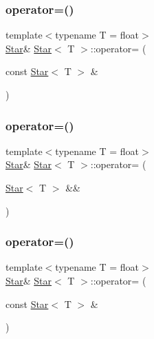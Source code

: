 \subsubsection{\texorpdfstring{operator=()}{operator=()}\hspace{0.1cm}{\footnotesize\ttfamily [2/4]}}
{\footnotesize\ttfamily template$<$typename T  = float$>$ \\
\mbox{\hyperlink{classStar}{Star}}\& \mbox{\hyperlink{classStar}{Star}}$<$ T $>$\+::operator= (\begin{DoxyParamCaption}\item[{const \mbox{\hyperlink{classStar}{Star}}$<$ T $>$ \&}]{ }\end{DoxyParamCaption})\hspace{0.3cm}{\ttfamily [default]}}

\mbox{\label{classStar_a7113d2808314f0aa2f5a87325f8c535d}} 
\subsubsection{\texorpdfstring{operator=()}{operator=()}\hspace{0.1cm}{\footnotesize\ttfamily [3/4]}}
{\footnotesize\ttfamily template$<$typename T  = float$>$ \\
\mbox{\hyperlink{classStar}{Star}}\& \mbox{\hyperlink{classStar}{Star}}$<$ T $>$\+::operator= (\begin{DoxyParamCaption}\item[{\mbox{\hyperlink{classStar}{Star}}$<$ T $>$ \&\&}]{ }\end{DoxyParamCaption})\hspace{0.3cm}{\ttfamily [default]}}

\mbox{\label{classStar_a3507f157448e082ccfcadc4783f2610e}} 
\subsubsection{\texorpdfstring{operator=()}{operator=()}\hspace{0.1cm}{\footnotesize\ttfamily [4/4]}}
{\footnotesize\ttfamily template$<$typename T  = float$>$ \\
\mbox{\hyperlink{classStar}{Star}}\& \mbox{\hyperlink{classStar}{Star}}$<$ T $>$\+::operator= (\begin{DoxyParamCaption}\item[{const \mbox{\hyperlink{classStar}{Star}}$<$ T $>$ \&}]{ }\end{DoxyParamCaption})\hspace{0.3cm}{\ttfamily [default]}}

